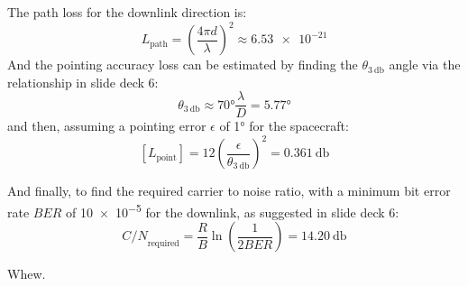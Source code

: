 \documentclass[9pt]{article}
\begin{document}
The path loss for the downlink direction is:
\begin{equation}\label{eq:101}
  L_\text{path}=\left(\frac{4\pi d}{\lambda}\right)^2\approx\num{6.53e-21}
\end{equation}
And the pointing accuracy loss can be estimated by finding the $\theta_{\qty{3}{\decibel}}$ angle via the relationship in slide deck 6:
\begin{equation}
  \theta_{\qty{3}{\decibel}}\approx\ang{70}\frac{\lambda}{D}=\ang{5.77}
\end{equation}
and then, assuming a pointing error $\epsilon$ of \ang{1} for the spacecraft:
\begin{equation}\label{eq:302}
  [L_\text{point}]=12\left(\frac{\epsilon}{\theta_{\qty{3}{\decibel}}}\right)^2=\qty{0.361}{\decibel}
\end{equation}

And finally, to find the required carrier to noise ratio, with a minimum bit error rate ${BER}$ of \num{10e-5} for the downlink, as suggested in slide deck 6:
\begin{equation}\label{eq:102}
  {C/N}_\text{required}=\frac RB\ln\left(\frac{1}{2{BER}}\right)=\qty{14.20}{\decibel}
\end{equation}

Whew.
\end{document}
